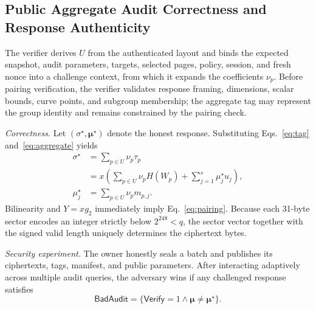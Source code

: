 \documentclass[10pt,journal]{IEEEtran}
\begin{document}
\subsection{Public Aggregate Audit Correctness and Response Authenticity}\label{sec:audit-scope}
The verifier derives $U$ from the authenticated layout and binds the expected snapshot, audit parameters, targets, selected pages, policy, session, and fresh nonce into a challenge context, from which it expands the coefficients $\nu_p$. Before pairing verification, the verifier validates response framing, dimensions, scalar bounds, curve points, and subgroup membership; the aggregate tag may represent the group identity and remains constrained by the pairing check.

\emph{Correctness.} Let $(\sigma^\star,\boldsymbol\mu^\star)$ denote the honest response. Substituting Eqs.~\eqref{eq:tag} and~\eqref{eq:aggregate} yields
\begin{equation}\label{eq:honest}
\begin{aligned}
\sigma^\star
&=\sum_{p\in U}\nu_p\tau_p\\
&=x\left(\sum_{p\in U}\nu_pH(W_p)+\sum_{j=1}^{s}\mu_j^\star u_j\right),\\
\mu_j^\star&=\sum_{p\in U}\nu_p m_{p,j}.
\end{aligned}
\end{equation}
Bilinearity and $Y=xg_2$ immediately imply Eq.~\eqref{eq:pairing}. Because each 31-byte sector encodes an integer strictly below $2^{248}<q$, the sector vector together with the signed valid length uniquely determines the ciphertext bytes.

\emph{Security experiment.} The owner honestly seals a batch and publishes its ciphertexts, tags, manifest, and public parameters. After interacting adaptively across multiple audit queries, the adversary wins if any challenged response satisfies
\begin{equation}\label{eq:bad-audit}
\mathsf{BadAudit}
=\{\mathsf{Verify}=1\land\boldsymbol\mu\ne\boldsymbol\mu^\star\}.
\end{equation}
\end{document}
